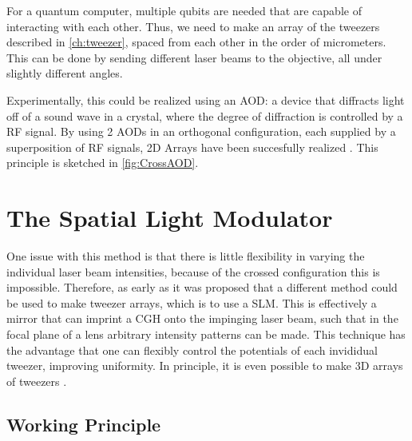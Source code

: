 For a quantum computer, multiple qubits are needed that are capable of interacting with each other. Thus, we need to make an array of the tweezers described in \cref{ch:tweezer}, spaced from each other in the order of micrometers. This can be done by sending different laser beams to the objective, all under slightly different angles. 

Experimentally, this could be realized using an \ac{AOD}: a device that diffracts light off of a sound wave in a crystal, where the degree of diffraction is controlled by a \ac{RF} signal. By using 2 AODs in an orthogonal configuration, each supplied by a superposition of RF signals, 2D Arrays have been succesfully realized \cite{Manuel2016}. This principle is sketched in \cref{fig:CrossAOD}.

\section{The Spatial Light Modulator}

One issue with this method is that there is little flexibility in varying the individual laser beam intensities, because of the crossed configuration this is impossible. Therefore, as early as \cite{Bergamini2004} it was proposed that a different method could be used to make tweezer arrays, which is to use a \ac{SLM}. This is effectively a mirror that can imprint a \ac{CGH} onto the impinging laser beam, such that in the focal plane of a lens arbitrary intensity patterns can be made. This technique has the advantage that one can flexibly control the potentials of each invididual tweezer, improving uniformity. In principle, it is even possible to make 3D arrays of tweezers \cite{DiLeonardo2007,Barredo2016}.

\subsection{Working Principle}

